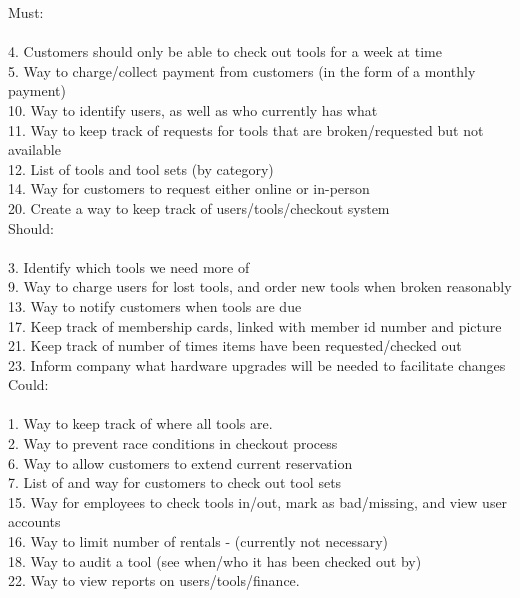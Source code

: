 \documentclass[12pt,letterpaper]{article}
\begin{document}
Must:\\\\
4. Customers should only be able to check out tools for a week at time\\
5. Way to charge/collect payment from customers (in the form of a monthly payment)\\
10. Way to identify users, as well as who currently has what\\
11. Way to keep track of requests for tools that are broken/requested but not available\\
12. List of tools and tool sets (by category)\\
14. Way for customers to request either online or in-person\\
20. Create a way to keep track of users/tools/checkout system\\

Should:\\\\
3. Identify which tools we need more of\\
9. Way to charge users for lost tools, and order new tools when broken reasonably\\
13. Way to notify customers when tools are due\\
17. Keep track of membership cards, linked with member id number and picture\\
21. Keep track of number of times items have been requested/checked out\\
23. Inform company what hardware upgrades will be needed to facilitate changes\\

Could:\\\\
1. Way to keep track of where all tools are.\\
2. Way to prevent race conditions in checkout process\\
6. Way to allow customers to extend current reservation\\
7. List of and way for customers to check out tool sets\\
15. Way for employees to check tools in/out, mark as bad/missing, and view user accounts\\
16. Way to limit number of rentals - (currently not necessary)\\
18. Way to audit a tool (see when/who it has been checked out by)\\
22. Way to view reports on users/tools/finance.\\
\end{document}
